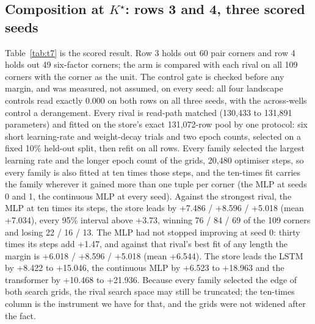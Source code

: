 \documentclass{article} %
\newcommand{\Kstar}{\ensuremath{K^{\star}}}
\begin{document}
\subsection{Composition at $\Kstar$: rows 3 and 4, three scored seeds}
\label{sec:shapes-t7}

Table~\ref{tab:t7} is the scored result. Row 3 holds out 60 pair corners and row 4 holds out
49 six-factor corners; the arm is compared with each rival on all 109 corners with the corner
as the unit. %
The control gate is checked before any margin, and was measured, not assumed, on every seed:
all four landscape controls read exactly 0.000 on both rows on all three seeds, with the
across-wells control a derangement. %
Every rival is read-path matched (130,433 to 131,891 parameters) and fitted on the store's exact
131,072-row pool by one protocol: six short learning-rate and weight-decay trials and two epoch
counts, selected on a fixed 10\% held-out split, then refit on all rows. Every family selected the
largest learning rate and the longer epoch count of the grids, 20,480 optimiser steps, so every
family is also fitted at ten times those steps, and the ten-times fit carries the family wherever
it gained more than one tuple per corner (the MLP at seeds 0 and 1, the continuous MLP at every
seed). Against the strongest rival, the MLP at ten times its steps, the store leads by +7.486 /
+8.596 / +5.018 (mean +7.034), every 95\% interval above +3.73, winning 76 / 84 / 69 of the 109
corners and losing 22 / 16 / 13. The MLP had not stopped improving at seed 0: thirty times its steps
add +1.47, and against that rival's best fit of any length the margin is +6.018 / +8.596 / +5.018
(mean +6.544). The store leads the LSTM by +8.422 to +15.046, the continuous MLP by +6.523 to +18.963
and the transformer by +10.468 to +21.936. Because every family selected the edge of both search
grids, the rival search space may still be truncated; the ten-times column is the instrument we
have for that, and the grids were not widened after the fact.
\end{document}
